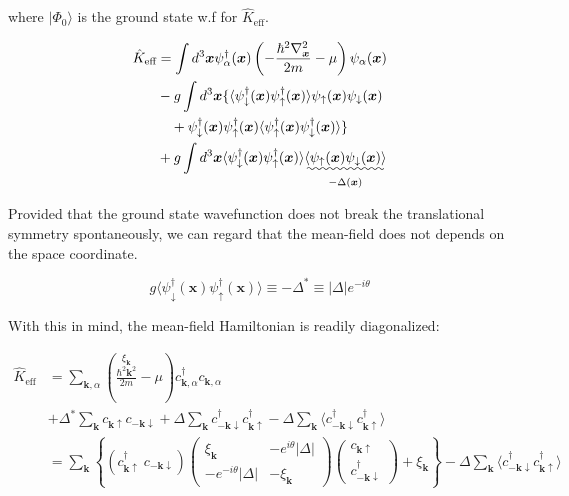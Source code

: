 where $|\Phi_0\rangle$ is the ground state w.f for $\hat{K}_{\text{eff}}$. 

\[
\begin{split}
\hat{K}_{\text{eff}}&=\int d^3\bm{x}\psi_\alpha^\dagger(\bm{x})\left(-\frac{\hbar^2\nabla_{\bm{x}}^2}{2m}-\mu\right)\psi_\alpha(\bm{x})\\
&-g\int d^3\bm{x}\{\langle\psi_\downarrow^\dagger(\bm{x})\psi_\uparrow^\dagger(\bm{x})\rangle \psi_\uparrow(\bm{x})\psi_\downarrow(\bm{x})\\
&\quad+\psi_\downarrow^\dagger(\bm{x})\psi_\uparrow^\dagger(\bm{x}) \langle\psi_\uparrow^\dagger(\bm{x})\psi_\downarrow^\dagger(\bm{x})\rangle\}\\
&+g\int d^3\bm{x}\langle\psi_\downarrow^\dagger(\bm{x})\psi_\uparrow^\dagger(\bm{x})\rangle \underset{-\Delta(\bm{x})}{\uwave{\langle\psi_\uparrow(\bm{x})\psi_\downarrow(\bm{x})\rangle}}
\end{split}
 \]

Provided that the ground state wavefunction does not break the translational symmetry spontaneously, we can regard that the mean-field does not depends on the space coordinate. 

\[g\langle\psi_\downarrow^\dagger(\bm{x})\psi_\uparrow^\dagger(\bm{x})\rangle \equiv-\Delta^*\equiv|\Delta|e^{-i\theta} \]

With this in mind, the mean-field Hamiltonian is readily diagonalized:

\[\begin{split}
\hat{K}_{\text{eff}} &=\sum_{\bm{k}, \alpha}\left(\overset{\xi_{\bm{k}}}{\frac{\hbar^2\bm{k}^2}{2m}}-\mu\right)c_{\bm{k},\alpha}^\dagger c_{\bm{k},\alpha}\\
&+\Delta^* \sum_{\bm{k}} c_{\bm{k}\uparrow}c_{-\bm{k}\downarrow}+ \Delta\sum_{\bm{k}}c_{-\bm{k}\downarrow}^\dagger c_{\bm{k}\uparrow}^\dagger - \Delta\sum_{\bm{k}}\langle c_{-\bm{k}\downarrow}^\dagger c_{\bm{k}\uparrow}^\dagger\rangle\\
&=\sum_{\bm{k}}\left\{(c_{\bm{k}\uparrow}^\dagger\  c_{-\bm{k}\downarrow}) \left(\begin{matrix}
\xi_{\bm{k}} & -e^{i\theta}|\Delta|\\
-e^{-i\theta}|\Delta| & -\xi_{\bm{k}}
\end{matrix}\right)
\left(\begin{matrix}
c_{\bm{k}\uparrow}\\
c_{-\bm{k}\downarrow}^\dagger
\end{matrix}\right)+\xi_{\bm{k}}\right\}-\Delta\sum_{\bm{k}}\langle c_{-\bm{k}\downarrow}^\dagger c_{\bm{k}\uparrow}^\dagger\rangle
\end{split} \]


